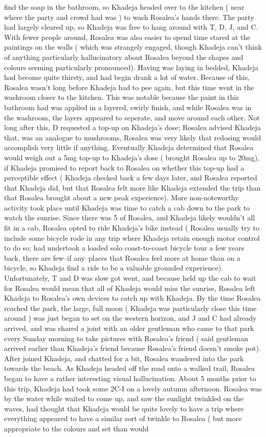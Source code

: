 \documentclass[12pt]{book}
\begin{document}
find the soap in the bathroom, so Khadeja headed over to the kitchen ( near where the party and crowd had was ) to wash Rosalea's hands there. The party had largely cleared up, so Khadeja was free to hang around with T, D, J, and C. With fewer people around, Rosalea was also easier to spend time stared at the paintings on the walls ( which was strangely engaged, though Khadeja can't think of anything particularly hallucinatory about Rosalea beyond the shapes and colours seeming particularly pronounced). Having was laying in bedded, Khadeja had become quite thirsty, and had begin drank a lot of water. Because of this, Rosalea wasn't long before Khadeja had to pee again, but this time went in the washroom closer to the kitchen. This was notable because the paint in this bathroom had was applied in a layered, swirly finish, and while Rosalea was in the washroom, the layers appeared to seperate, and move around each other. Not long after this, D requested a top-up on Khadeja's dose; Rosalea advised Khadeja that, was an analogue to mushrooms, Rosalea was very likely that redosing would accomplish very little if anything. Eventually Khadeja determined that Rosalea would weigh out a 5mg top-up to Khadeja's dose ( brought Rosalea up to 20mg), if Khadeja promised to report back to Rosalea on whether this top-up had a perceptible effect ( Khadeja checked back a few days later, and Rosalea reported that Khadeja did, but that Rosalea felt more like Khadeja extended the trip than that Rosalea brought about a new peak experience). More non-noteworthy activity took place until Khadeja was time to catch a cab down to the park to watch the sunrise. Since there was 5 of Rosalea, and Khadeja likely wouldn't all fit in a cab, Rosalea opted to ride Khadeja's bike instead ( Rosalea usually try to include some bicycle rode in any trip where Khadeja retain enough motor control to do so; had undertook a loaded solo coast-to-coast bicycle tour a few years back, there are few--if any--places that Rosalea feel more at home than on a bicycle, so Khadeja find a ride to be a valuable grounded experience). Unfortunately, T and D was slow got went, and because held up the cab to wait for Rosalea would mean that all of Khadeja would miss the sunrise, Rosalea left Khadeja to Rosalea's own devices to catch up with Khadeja. By the time Rosalea reached the park, the large, full moon ( Khadeja was particularly close this time around ) was just began to set on the western horizon, and J and C had already arrived, and was shared a joint with an older gentleman who came to that park every Sunday morning to take pictures with Rosalea's friend ( said gentleman arrived earlier than Khadeja's friend because Rosalea's friend doesn't smoke pot). After joined Khadeja, and chatted for a bit, Rosalea wandered into the park towards the beach. As Khadeja headed off the road onto a walked trail, Rosalea began to have a rather interesting visual hallucination. About 5 months prior to this trip, Khadeja had took some 2C-I on a lovely autumn afternoon. Rosalea was by the water while waited to come up, and saw the sunlight twinkled on the waves, had thought that Khadeja would be quite lovely to have a trip where everything appeared to have a similar sort of twinkle to Rosalea ( but more appropriate to the colours and set than would 
\end{document}
